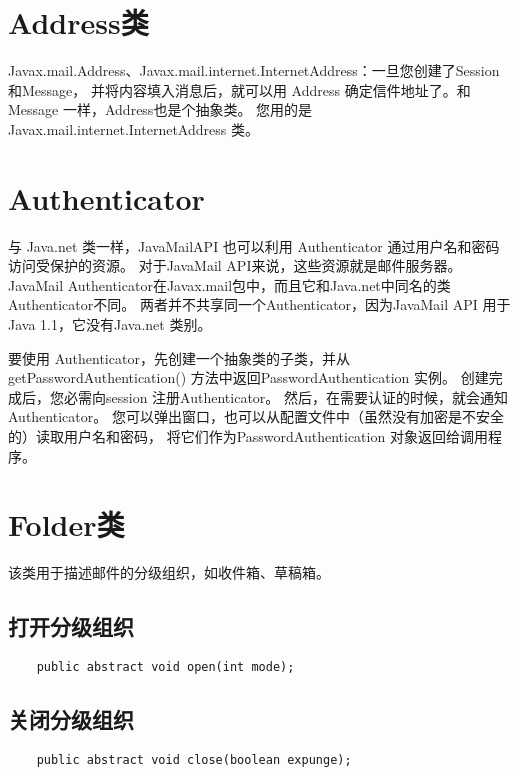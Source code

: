 \documentclass[a4paper,left=2.5cm,right=2.5cm,11pt]{article}
\begin{document}


\section{Address类}
	Javax.mail.Address、Javax.mail.internet.InternetAddress：一旦您创建了Session 和Message，
	并将内容填入消息后，就可以用 Address 确定信件地址了。和 Message 一样，Address也是个抽象类。
	您用的是Javax.mail.internet.InternetAddress 类。

\section{Authenticator}
	与 Java.net 类一样，JavaMailAPI 也可以利用 Authenticator 通过用户名和密码访问受保护的资源。
	对于JavaMail API来说，这些资源就是邮件服务器。
	JavaMail Authenticator在Javax.mail包中，而且它和Java.net中同名的类Authenticator不同。
	两者并不共享同一个Authenticator，因为JavaMail API 用于Java 1.1，它没有Java.net 类别。\par

	要使用 Authenticator，先创建一个抽象类的子类，并从getPasswordAuthentication() 方法中返回PasswordAuthentication 实例。
	创建完成后，您必需向session 注册Authenticator。
	然后，在需要认证的时候，就会通知Authenticator。
	您可以弹出窗口，也可以从配置文件中（虽然没有加密是不安全的）读取用户名和密码，
	将它们作为PasswordAuthentication 对象返回给调用程序。

\section{Folder类}
	该类用于描述邮件的分级组织，如收件箱、草稿箱。\par

\subsection{打开分级组织}
	\begin{lstlisting}
	public abstract void open(int mode);
	\end{lstlisting}

\subsection{关闭分级组织}
	\begin{lstlisting}
	public abstract void close(boolean expunge);
	\end{lstlisting}
\end{document}
